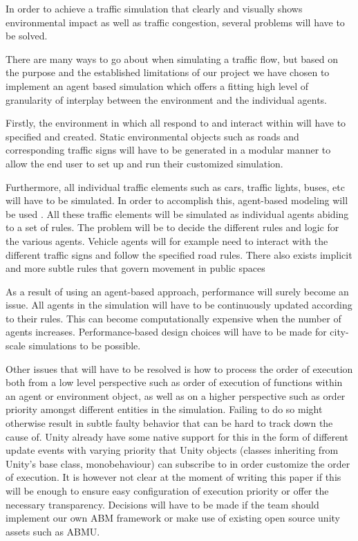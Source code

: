 In order to achieve a traffic simulation that clearly and visually shows environmental impact as well as traffic congestion, several problems will have to be solved.

There are many ways to go about when simulating a traffic flow, but based on the purpose and the established limitations of our project we have chosen to implement an agent based simulation which offers a fitting high level of granularity of interplay between the environment and the individual agents. 

Firstly, the environment in which all  respond to and interact within will have to specified and created. Static environmental objects such as roads and corresponding traffic signs will have to be generated in a modular manner to allow the end user to set up and run their customized simulation. 

Furthermore, all individual traffic elements such as cars, traffic lights, buses, etc will have to be simulated. In order to accomplish this, agent-based modeling will be used \cite{agent-based-modeling}. All these traffic elements will be simulated as individual agents  abiding to a set of rules. The problem will be to decide the different rules and logic for the various agents. Vehicle agents will for example need to interact with the different traffic signs and follow the specified road rules.
There also exists implicit and more subtle rules that govern movement in public spaces

As a result of using an agent-based approach, performance will surely become an issue. All agents in the simulation will have to be continuously updated according to their rules. This can become computationally expensive when the number of agents increases. Performance-based design choices will have to be made for city-scale simulations to be possible.

Other issues that will have to be resolved is how to process the order of execution both from a low level perspective such as order of execution of functions within an agent or environment object, as well as on a higher perspective such as order priority amongst different entities in the simulation. Failing to do so might otherwise result in subtle faulty behavior that can be hard to track down the cause of. Unity already have some native support for this in the form of different update events with varying priority that Unity objects (classes inheriting from Unity's base class, monobehaviour) can subscribe to in order customize the order of execution. It is however not clear at the moment of writing this paper if this will be enough to ensure easy configuration of execution priority or offer the necessary transparency. Decisions will have to be made if the team should implement our own ABM framework or make use of existing open source unity assets such as ABMU.

